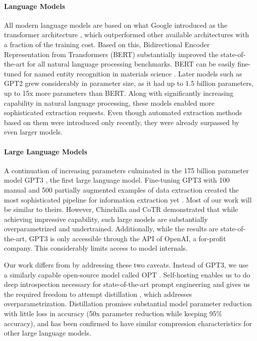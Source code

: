 \documentclass[a4paper,11pt]{article}
\begin{document}
\paragraph{Language Models}
All modern language models are based on what Google introduced as the
transformer architecture \cite{vaswani_attention_2017}, which outperformed
other available architectures with a fraction of the training cost. Based on
this, Bidirectional Encoder Representation from Transformers (BERT)
\cite{devlin_bert_2018} substantially improved the state-of-the-art for all
natural language processing benchmarks. BERT can be easily fine-tuned for named
entity recognition in materials science \cite{zhao_finetuning_2021b}. Later
models such as GPT2 \cite{radford_language_2019} grew considerably in parameter
size, as it had up to 1.5 billion parameters, up to 15x more parameters than
BERT. Along with significantly increasing capability in natural language
processing, these models enabled more sophisticated extraction requests.
Even though automated extraction methods based on them were introduced only
recently, they were already surpassed by even larger models.

\paragraph{Large Language Models}
A continuation of increasing parameters culminated in the 175 billion parameter
model GPT3 \cite{brown_language_2020}, the first large language model. Fine-tuning
GPT3 with 100 manual and 500 partially augmented examples of data extraction
created the most sophisticated pipeline for information extraction yet
\cite{dunn_structured_2022}. Most of our work will be similar to theirs. However,
Chinchilla \cite{hoffmann_training_2022} and CoTR \cite{zhang_multimodal_2023}
demonstrated that while achieving impressive capability, such large models are
substantially overparametrized and undertrained. Additionally, while the
results are state-of-the-art, GPT3 is only accessible through the API of
OpenAI, a for-profit company. This considerably limits access to model
internals.

Our work differs from \cite{dunn_structured_2022} by addressing these two
caveats. Instead of GPT3, we use a similarly capable open-source model called
OPT \cite{zhang_opt_2022}. Self-hosting enables us to do deep introspection
necessary for state-of-the-art prompt engineering and gives us the required
freedom to attempt distillation \cite{sun_patient_2019}, which addresses
overparametrization. Distillation promises substantial model parameter
reduction with little loss in accuracy (50x parameter reduction while keeping
95\% accuracy), and has been confirmed to have similar compression characteristics
for other large language models.
\end{document}
